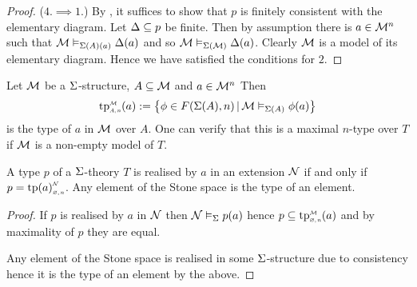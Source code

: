 \begin{proof}
    ($4. \implies 1.$)
        By ,
        it suffices to show that $p$ 
        is finitely consistent with the elementary diagram.
        Let $\Delta \subseteq p$ be finite.
        Then by assumption there is $a \in {\mathcal{M}}^n$ such that 
        $\mathcal{M} \vDash_{\Sigma(A)(a)} \Delta(a)$ and so $\mathcal{M} \vDash_{\Sigma(\mathcal{M})} \Delta(a)$.
        Clearly $\mathcal{M}$ is a model of its elementary diagram.
        Hence we have satisfied the conditions for $2$.
\end{proof}

\begin{dfn}
    Let $\mathcal{M}$ be a $\Sigma$-structure, 
    $A \subseteq {\mathcal{M}}$ and $a \in {\mathcal{M}}^n$
    Then 
    \[\subintp{A,n}{\MM}{\tp}(a) := 
    \set{\phi \in F(\Si(A),n) \st \MM \model{\Si(A)} \phi(a)}\]
    is the type of $a$ in $\mathcal{M}$ over $A$.
    One can verify that this is a maximal $n$-type over $T$
    if $\mathcal{M}$ is a non-empty model of $T$.
\end{dfn}

\begin{prop}
    A type $p$ of a $\Sigma$-theory $T$ 
    is realised by $a$ in an extension $\mathcal{N}$ if and only if 
    $p = \subintp{\nothing,n}{\NN}{\tp(a)}$.
    Any element of the Stone space is the type of an element.
\end{prop}
\begin{proof}
    If $p$ is realised by $a$ in $\mathcal{N}$ then 
    $\mathcal{N} \vDash_{\Sigma} p(a)$ hence $p \subs \subintp{\nothing,n}{\MM}{\tp}(a)$
    and by maximality of $p$ they are equal.

    Any element of the Stone space is realised in some 
    $\Sigma$-structure due to consistency
    hence it is the type of an element by the above.
\end{proof}

